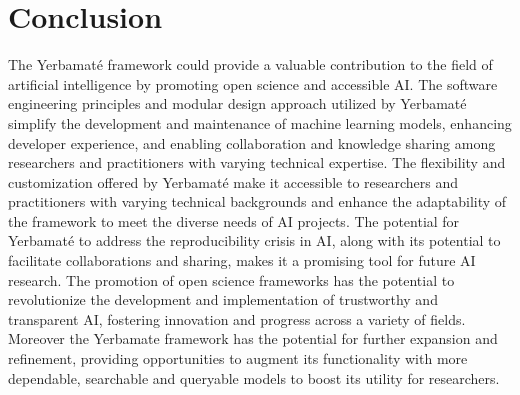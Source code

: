 
\section{Conclusion}





The Yerbamaté framework could provide a valuable contribution to the field of artificial intelligence by promoting open science and accessible AI. The software engineering principles and modular design approach utilized by Yerbamaté simplify the development and maintenance of machine learning models, enhancing developer experience, and enabling collaboration and knowledge sharing among researchers and practitioners with varying technical expertise. The flexibility and customization offered by Yerbamaté make it accessible to researchers and practitioners with varying technical backgrounds and enhance the adaptability of the framework to meet the diverse needs of AI projects. The potential for Yerbamaté to address the reproducibility crisis in AI, along with its potential to facilitate collaborations and sharing, makes it a promising tool for future AI research. The promotion of open science frameworks has the potential to revolutionize the development and implementation of trustworthy and transparent AI, fostering innovation and progress across a variety of fields. Moreover the Yerbamate framework has the potential for further expansion and refinement, providing opportunities to augment its functionality with more dependable, searchable and queryable models to boost its utility for researchers.

